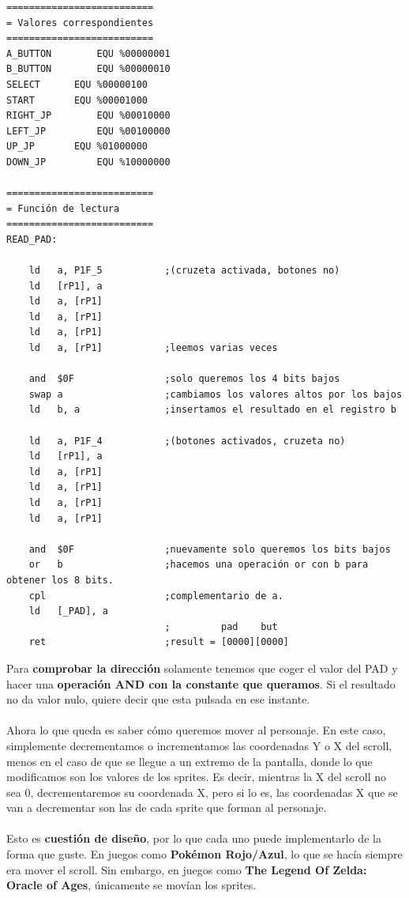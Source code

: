 \begin{lstlisting}[caption={Lectura del PAD}, label={code:read_pad}]
==========================
= Valores correspondientes
==========================
A_BUTTON 		EQU %00000001
B_BUTTON 		EQU %00000010
SELECT 		EQU %00000100
START 		EQU %00001000
RIGHT_JP 		EQU %00010000
LEFT_JP 		EQU %00100000
UP_JP 		EQU %01000000
DOWN_JP 		EQU %10000000

==========================
= Función de lectura
==========================
READ_PAD:
	
	ld 	 a, P1F_5    		;(cruzeta activada, botones no)
    ld 	 [rP1], a
	ld 	 a, [rP1]
	ld 	 a, [rP1]
	ld 	 a, [rP1]
	ld 	 a, [rP1] 			;leemos varias veces

	and  $0F 				;solo queremos los 4 bits bajos
	swap a  				;cambiamos los valores altos por los bajos
	ld 	 b, a 				;insertamos el resultado en el registro b

	ld 	 a, P1F_4    		;(botones activados, cruzeta no)
    ld 	 [rP1], a
	ld 	 a, [rP1]
	ld 	 a, [rP1]
	ld 	 a, [rP1]
	ld 	 a, [rP1]

	and  $0F 				;nuevamente solo queremos los bits bajos
	or   b 					;hacemos una operación or con b para obtener los 8 bits.
	cpl 					;complementario de a.
	ld 	 [_PAD], a
							;         pad    but
	ret 					;result = [0000][0000]
\end{lstlisting}

Para \textbf{comprobar la dirección} solamente tenemos que coger el valor del PAD y hacer una \textbf{operación AND con la constante que queramos}. Si el resultado no da valor nulo, quiere decir que esta pulsada en ese instante.
\\ \\
Ahora lo que queda es saber cómo queremos mover al personaje. En este caso, simplemente decrementamos o incrementamos las coordenadas Y o X del scroll, menos en el caso de que se llegue a un extremo de la pantalla, donde lo que modificamos son los valores de los sprites. Es decir, mientras la X del scroll no sea 0, decrementaremos su coordenada X, pero si lo es, las coordenadas X que se van a decrementar son las de cada sprite que forman al personaje.
\\ \\
Esto es \textbf{cuestión de diseño}, por lo que cada uno puede implementarlo de la forma que guste. En juegos como \textbf{Pokémon Rojo/Azul}, lo que se hacía siempre era mover el scroll. Sin embargo, en juegos como \textbf{The Legend Of Zelda: Oracle of Ages}, únicamente se movían los sprites.

